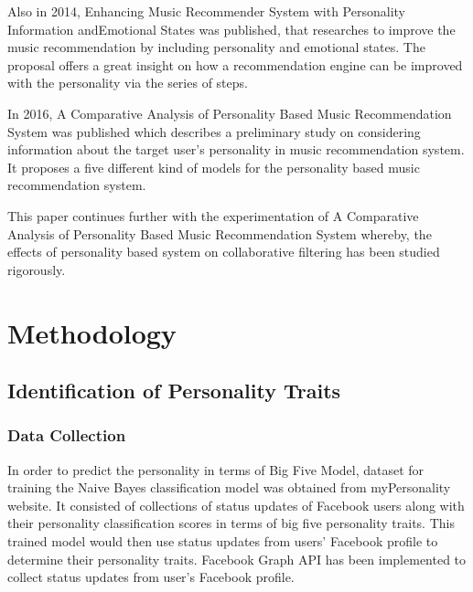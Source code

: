 \documentclass[conference]{IEEEtran}
\begin{document}
Also in 2014, Enhancing Music Recommender System with Personality Information andEmotional States \cite{bruce} was published, that researches to improve the music recommendation by including personality and emotional states. The proposal offers a great insight on how a recommendation engine can be improved with the personality via the series of steps.

In 2016, A Comparative Analysis of Personality Based Music Recommendation System \cite{melissa} was published which describes a preliminary study on considering information about the target user's personality in music recommendation system. It proposes a five different kind of models for the personality based music recommendation system.

This paper continues further with the experimentation of A Comparative Analysis of Personality Based Music Recommendation System whereby, the effects of personality based system on collaborative filtering has been studied rigorously.

\section{Methodology}

\subsection{Identification of Personality Traits}
\subsubsection{Data Collection}
In order to predict the personality in terms of Big Five Model, dataset for training the Naive Bayes classification model was obtained from myPersonality website\cite{dataset}. It consisted of collections of status updates of Facebook users along with their personality classification scores in terms of big five personality traits. This trained model would then use status updates from users' Facebook profile to determine their personality traits. Facebook Graph API has been implemented to collect status updates from user's Facebook profile.
\end{document}
